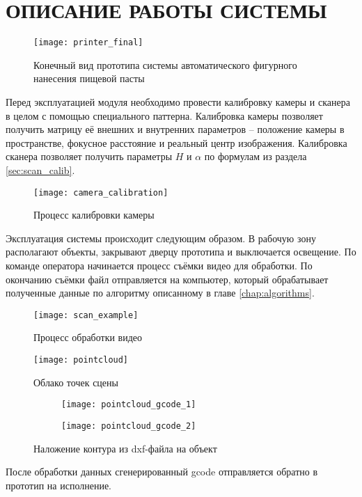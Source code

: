 \chapter{ОПИСАНИЕ РАБОТЫ СИСТЕМЫ}
    \begin{figure}[H]
        \centering
        \texttt{[image: printer\_final]}\\
        \caption{Конечный вид прототипа системы автоматического фигурного нанесения пищевой пасты}
    \end{figure}

    Перед эксплуатацией модуля необходимо провести калибровку камеры и сканера в целом с помощью специального паттерна. Калибровка камеры позволяет получить матрицу её внешних и внутренних параметров -- положение камеры в пространстве, фокусное расстояние и реальный центр изображения.
    Калибровка сканера позволяет получить параметры $ H $ и $ \alpha $ по формулам из раздела \ref{sec:scan_calib}. 
    
    \begin{figure}[H]
        \centering
        \texttt{[image: camera\_calibration]}
        \caption{Процесс калибровки камеры}
    \end{figure}
    
    Эксплуатация системы происходит следующим образом. В рабочую зону располагают объекты, закрывают дверцу прототипа и выключается освещение. По команде оператора начинается процесс съёмки видео для обработки. По окончанию съёмки файл отправляется на компьютер, который обрабатывает полученные данные по алгоритму описанному в главе \ref{chap:algorithms}.
    
    \begin{figure}[H]
        \centering
        \texttt{[image: scan\_example]}
        \caption{Процесс обработки видео}
    \end{figure}
    \begin{figure}[H]
        \centering
        \texttt{[image: pointcloud]}
        \caption{Облако точек сцены}
    \end{figure}
    \begin{figure}[H]
        \begin{subfigure}{0.5\linewidth}
            \texttt{[image: pointcloud\_gcode\_1]}
        \end{subfigure}
        \begin{subfigure}{0.5\linewidth}
            \texttt{[image: pointcloud\_gcode\_2]}
        \end{subfigure}
        \caption{Наложение контура из dxf-файла на объект}
    \end{figure}
    
    После обработки данных сгенерированный gcode отправляется обратно в прототип на исполнение.